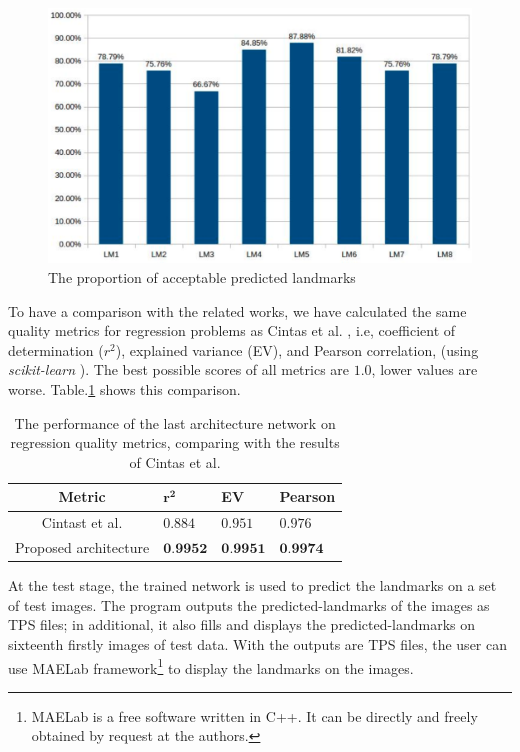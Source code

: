 \documentclass[conference]{IEEEtran}
\begin{document}
\begin{figure}[htbp]
	\centerline{\includegraphics[scale=0.2]{images/chart.eps}}
	\caption{The proportion of acceptable predicted landmarks}
	\label{figchart}
\end{figure}

To have a comparison with the related works, we have calculated the same quality metrics for regression problems as Cintas et al. \cite{cintas2016automatic}, i.e,  coefficient of determination ($r^2$), explained variance (EV), and Pearson correlation, (using \textit{scikit-learn} \cite{pedregosa2011scikit}). The best possible scores of all metrics are $1.0$, lower values are worse. Table.\ref{tab3} shows this comparison.

\begin{table}[htbp]
\centering
\caption{The performance of the last architecture network on regression quality metrics, comparing with the results of Cintas et al. \cite{cintas2016automatic}}
\begin{center}
\begin{tabular}{|c|p{1cm}|p{1cm}|p{1cm}|}
\hline
Metric & $\mathbf{r^{2}}$ & \textbf{EV} & \textbf{Pearson} \\ \hline
Cintast et al. \cite{cintas2016automatic} & $0.884$ & $0.951$ & $0.976$ \\ \hline
Proposed architecture & $\textbf{0.9952}$ & $\textbf{0.9951}$ & $\textbf{0.9974}$ \\ \hline
\end{tabular}
\label{tab3}
\end{center}
\end{table}

At the test stage, the trained network is used to predict the landmarks on a set of test images. The program outputs the predicted-landmarks of the images as TPS files; in additional, it also fills and displays the predicted-landmarks on sixteenth firstly images of test data. With the outputs are TPS files, the user can use MAELab \cite{le2017maelab} framework\footnote{MAELab is a free software written in C++. It can be directly and freely obtained by request at the authors.} to display the landmarks on the images.
\end{document}
